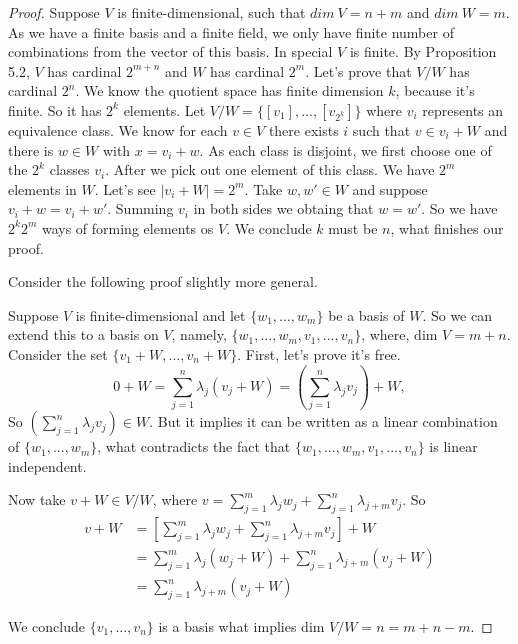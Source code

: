 \begin{proof}

Suppose $V$ is finite-dimensional, such that $dim ~V = n + m$ and $dim ~W =
m$. As we have a finite basis and a finite field, we only have finite
number of combinations from the vector of this basis. In special $V$ is finite. By Proposition 5.2,
$V$ has cardinal $2^{m+n}$ and $W$ has cardinal $2^m$. Let's prove that $V/W$
has cardinal $2^n$. We know the quotient space has finite dimension $k$, because
it's finite. So it has $2^k$ elements. Let $V/W = \{[v_1], ..., [v_{2^k}]\}$ where
$v_i$ represents an equivalence class. We know for each $v \in V$ there
exists $i$ such that $v \in v_i + W$ and there is $w \in W$ with $x =
v_i + w$. As each class is disjoint, we first choose one of the $2^k$ classes
$v_i$. After we pick out one element of this class. We have $2^m$ elements in
$W$. Let's see $|v_i + W| = 2^m$. Take $w, w' \in W$ and  suppose $v_i + w =
v_i + w'$. Summing $v_i$ in both sides we obtaing that $w = w'$. So we have
$2^k 2^m$ ways
of forming elements os $V$. We conclude $k$ must be $n$, what finishes our proof. 

\begin{remark}
    Consider the following proof slightly more general. 
\end{remark}

Suppose $V$ is finite-dimensional and let $\{w_1, ..., w_m\}$ be a basis of
$W$. So we can extend this to a basis on $V$, namely, $\{w_1, ..., w_m, v_1,
..., v_{n}\}$, where, $\text{dim } V = m + n$. Consider the set $\{v_1 + W, ...,
v_n + W\}.$ First, let's prove it's free.
$$
0 + W = \sum_{j=1}^n \lambda_j(v_j + W) = \left(\sum_{j=1}^n \lambda_j v_j \right) + W, 
$$
So $\left(\sum_{j=1}^n \lambda_j v_j \right) \in W$. But it implies it can be
written as a linear combination of $\{w_1, ..., w_m\}$, what contradicts the
fact that $\{w_1, ..., w_m, v_1,
..., v_{n}\}$ is linear independent. 

Now take $v + W \in V/W$, where $v = \sum_{j=1}^m \lambda_j w_j + \sum_{j=1}^n
\lambda_{j+m} v_j$. So 
\begin{equation*}
    \begin{split}
        v + W &= \left[\sum_{j=1}^m \lambda_j w_j + \sum_{j=1}^n
        \lambda_{j+m} v_j\right] + W \\
        &= \sum_{j=1}^m \lambda_j (w_j + W) + \sum_{j=1}^n
        \lambda_{j+m} (v_j+ W) \\
        &= \sum_{j=1}^n
        \lambda_{j+m} (v_j+ W) 
    \end{split}
\end{equation*}

We conclude $\{v_1,
..., v_{n}\}$ is a basis what implies $\text{dim } V/W = n = m + n - m$. 

\end{proof}


